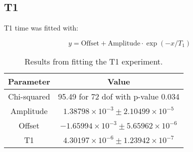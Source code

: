 \subsection{T1}
T1 time was fitted with:
\begin{fullwidth}
\begin{equation}
    y = \text{Offset} + \text{Amplitude} \cdot \exp \left(- x / T_1 \right)
\end{equation}
\end{fullwidth}

\begin{table}[h]
\centering
\begin{tabular}{|c|c|}
\hline
Parameter & Value \\
\hline
Chi-squared & 95.49 for 72 dof with p-value 0.034 \\
Amplitude & $1.38798 \times 10^{-3} \pm 2.10499 \times 10^{-5}$ \\
Offset & $-1.65994 \times 10^{-3} \pm 5.65962 \times 10^{-6}$ \\
T1 & $4.30197 \times 10^{-6} \pm 1.23942 \times 10^{-7}$ \\
\hline
\end{tabular}
\caption{Results from fitting the T1 experiment.}
\label{tab:fit_outcomes}
\end{table}
\FloatBarrier

